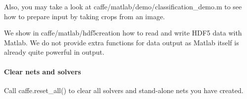 Also, you may take a look at caffe/matlab/demo/classification\+\_\+demo.\+m to see how to prepare input by taking crops from an image.

We show in caffe/matlab/hdf5creation how to read and write H\+D\+F5 data with Matlab. We do not provide extra functions for data output as Matlab itself is already quite powerful in output.

\paragraph*{Clear nets and solvers}

Call {\ttfamily caffe.\+reset\+\_\+all()} to clear all solvers and stand-\/alone nets you have created. 